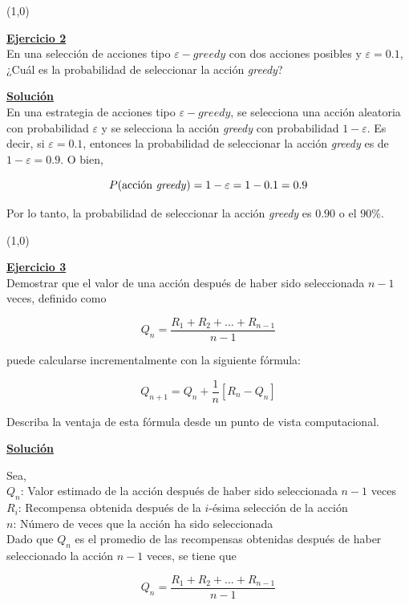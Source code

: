 \documentclass[12pt]{article}
\newlength\tindent
\renewcommand{\indent}{\hspace*{\tindent}}
\begin{document}
    \line(1,0){\textwidth}

    \indent\underline{\textbf{Ejercicio 2}}\\
    En una selección de acciones tipo $\varepsilon-greedy$ con dos acciones posibles y $\varepsilon=0.1$, ¿Cuál es la probabilidad de seleccionar la acción \textit{greedy}?

    \indent\underline{\textbf{Solución}}\\
    En una estrategia de acciones tipo $\varepsilon-greedy$, se selecciona una acción aleatoria con probabilidad $\varepsilon$ y se selecciona la acción \textit{greedy} con probabilidad $1-\varepsilon$.
    Es decir, si $\varepsilon=0.1$, entonces la probabilidad de seleccionar la acción \textit{greedy} es de $1-\varepsilon=0.9$.
    O bien,

    \[P(\text{acción \textit{greedy}}) = 1-\varepsilon = 1 - 0.1 = 0.9\]

    Por lo tanto, la probabilidad de seleccionar la acción \textit{greedy} es $0.90$ o el $90\%$.

    \line(1,0){\textwidth}

    \indent\underline{\textbf{Ejercicio 3}}\\
    Demostrar que el valor de una acción después de haber sido seleccionada $n-1$ veces, definido como

    \[ Q_{n} = \frac{R_{1} + R_{2} + \ldots + R_{n-1}}{n-1} \]

    puede calcularse incrementalmente con la siguiente fórmula:

    \[ Q_{n+1} = Q_{n} + \frac{1}{n} \left[ R_{n} - Q_{n} \right] \]

    Describa la ventaja de esta fórmula desde un punto de vista computacional.

    \indent\underline{\textbf{Solución}}

    Sea,\\
    $Q_{n}$: Valor estimado de la acción después de haber sido seleccionada $n-1$ veces \\
    $R_i$: Recompensa obtenida después de la $i$-ésima selección de la acción \\
    $n$: Número de veces que la acción ha sido seleccionada \\

    Dado que $Q_{n}$ es el promedio de las recompensas obtenidas después de haber seleccionado la acción $n-1$ veces, se tiene que

    \[ Q_{n} = \frac{R_{1} + R_{2} + \ldots + R_{n-1}}{n-1} \]
\end{document}
